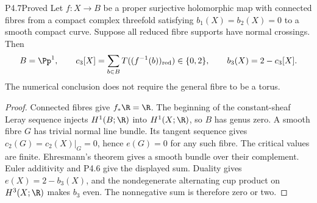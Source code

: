 \begin{statement}{P4.7}{Proved}
Let $f:X\to B$ be a proper surjective holomorphic map with connected
fibres from a compact complex threefold satisfying $b_1(X)=b_2(X)=0$
to a smooth compact curve. Suppose all reduced fibre supports have
normal crossings. Then
\[
 B=\Pp^1,\qquad
 c_3[X]=\sum_{b\in B}T((f^{-1}(b))_{\mathrm{red}})\in\{0,2\},\qquad
 b_3(X)=2-c_3[X].
\]
The numerical conclusion does not require the general fibre to be a
torus.
\end{statement}
\begin{proof}
Connected fibres give $f_*\R=\R$. The beginning of the constant-sheaf
Leray sequence injects $H^1(B;\R)$ into $H^1(X;\R)$, so $B$ has genus
zero. A smooth fibre $G$ has trivial normal line bundle. Its tangent
sequence gives $c_2(G)=c_2(X)|_G=0$, hence $e(G)=0$ for any such fibre.
The critical values are finite. Ehresmann's theorem gives a smooth
bundle over their complement. Euler additivity and P4.6 give the
displayed sum. Duality gives $e(X)=2-b_3(X)$, and the nondegenerate
alternating cup product on $H^3(X;\R)$ makes $b_3$ even. The
nonnegative sum is therefore zero or two.
\end{proof}

